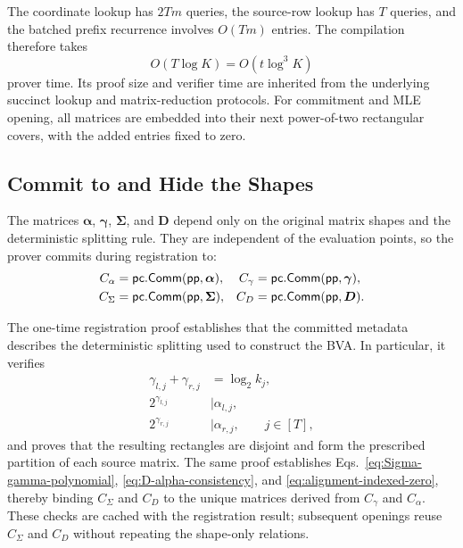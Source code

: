 The coordinate lookup has $2Tm$ queries, the source-row lookup has $T$
queries, and the batched prefix recurrence involves
$O(Tm)$ entries.  The compilation therefore takes
\[
    O(T\log K)
    =
    O(t\log^3K)
\]
prover time.  Its proof size and verifier time are inherited from the
underlying succinct lookup and matrix-reduction protocols.  For commitment
and MLE opening, all matrices are embedded into their next power-of-two
rectangular covers, with the added entries fixed to zero.

\subsection{Commit to and Hide the Shapes}
\label{sec:shape-hiding}

The matrices $\bm\alpha$, $\bm\gamma$, $\bm\Sigma$, and $\bm D$ depend only
on the original matrix shapes and the deterministic splitting rule.  They are
independent of the evaluation points, so the prover commits during
registration to:
\begin{equation}
\label{eq:shape-commitments}
\begin{aligned}
    C_\alpha&={\sf pc}.{\sf Comm}({\sf pp},\bm\alpha),
    &C_\gamma&={\sf pc}.{\sf Comm}({\sf pp},\bm\gamma),\\
    C_\Sigma&={\sf pc}.{\sf Comm}({\sf pp},\bm\Sigma),
    &C_D&={\sf pc}.{\sf Comm}({\sf pp},\bm D).
\end{aligned}
\end{equation}

The one-time registration proof establishes that the committed metadata
describes the deterministic splitting used to construct the BVA.  In
particular, it verifies
\begin{equation}
\label{eq:shape-registration}
\begin{aligned}
    \gamma_{l,j}+\gamma_{r,j}
    &=\log_2k_j,\\
    2^{\gamma_{l,j}}
    &\mid\alpha_{l,j},\\
    2^{\gamma_{r,j}}
    &\mid\alpha_{r,j},
    \qquad j\in[T],
\end{aligned}
\end{equation}
and proves that the resulting rectangles are disjoint and form the
prescribed partition of each source matrix.  The same proof establishes
Eqs.~\eqref{eq:Sigma-gamma-polynomial},
\eqref{eq:D-alpha-consistency}, and
\eqref{eq:alignment-indexed-zero}, thereby binding $C_\Sigma$ and $C_D$ to
the unique matrices derived from $C_\gamma$ and $C_\alpha$.  These checks are
cached with the registration result; subsequent openings reuse $C_\Sigma$
and $C_D$ without repeating the shape-only relations.

